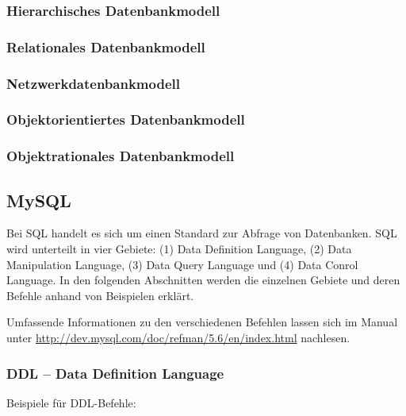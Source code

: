 \subsubsection{Hierarchisches Datenbankmodell}

\subsubsection{Relationales Datenbankmodell}

\subsubsection{Netzwerkdatenbankmodell}

\subsubsection{Objektorientiertes Datenbankmodell}

\subsubsection{Objektrationales Datenbankmodell}



\subsection{MySQL}

Bei SQL handelt es sich um einen Standard zur Abfrage von Datenbanken. SQL wird unterteilt in vier Gebiete: (1) Data Definition Language, (2) Data Manipulation Language, (3) Data Query Language und (4) Data Conrol Language. In den folgenden Abschnitten werden die einzelnen Gebiete und deren Befehle anhand von Beispielen erklärt.

Umfassende Informationen zu den verschiedenen Befehlen lassen sich im Manual unter \url{http://dev.mysql.com/doc/refman/5.6/en/index.html} nachlesen.

\subsubsection{DDL -- Data Definition Language}
Beispiele für DDL-Befehle:

